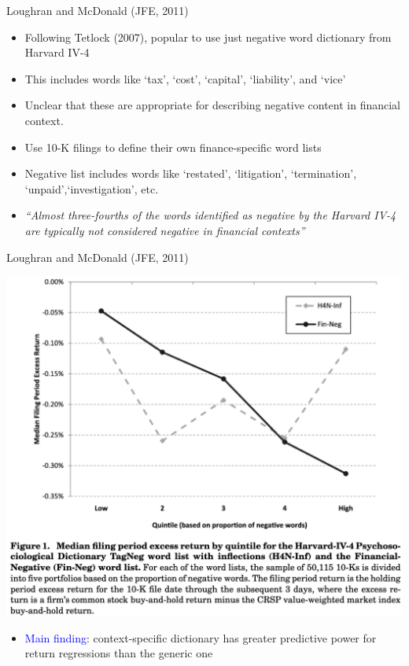 \documentclass[english]{beamer}
\begin{document}
\begin{frame}{Loughran and McDonald (JFE, 2011)}
\begin{itemize}
\setlength{\itemsep}{1.2em}
\item Following Tetlock (2007), popular to use just negative word dictionary from Harvard IV-4
\item This includes words like `tax', `cost', `capital', `liability', and `vice'
\item Unclear that these are appropriate for describing negative content in financial context.
\item Use 10-K filings to define their own finance-specific word lists
\item Negative list includes words like `restated', `litigation', `termination', `unpaid',`investigation', etc.
\item \textit{``Almost three-fourths of the words identified as negative by the Harvard IV-4 are typically not considered negative in financial contexts''}
\end{itemize}
\end{frame}


\begin{frame}{Loughran and McDonald (JFE, 2011)}
\begin{center}
\includegraphics[scale=0.2]{Images/mcdonald_2011.png}
\end{center}

\begin{itemize}
\item \textcolor{blue}{Main finding}: context-specific dictionary has greater predictive power for return regressions than the generic one
\end{itemize}


\end{frame}
\end{document}
